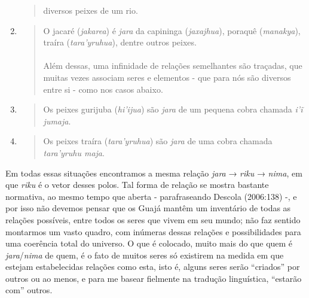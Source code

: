 \begin{enumerate}
\begin{quote}
  diversos peixes de um rio.
  \end{quote}
\item
  \begin{quote}
  O jacaré (\emph{jakarea}) é \emph{jara} da capininga
  (\emph{jaxajhua}), poraquê (\emph{manakya}), traíra
  (\emph{tara'yruhua}), dentre outros peixes.\\
  ~\\
  Além dessas, uma infinidade de relações semelhantes são traçadas, que
  muitas vezes associam seres e elementos - que para nós são diversos
  entre si - como nos casos abaixo.
  \end{quote}
\item
  \begin{quote}
  Os peixes gurijuba (\emph{hi'ijua}) são \emph{jara} de um pequena
  cobra chamada \emph{i'ĩ jumaja}.
  \end{quote}
\item
  \begin{quote}
  Os peixes traíra (\emph{tara'yruhua}) são \emph{jara} de uma cobra
  chamada \emph{tara'yruhu maja}.
  \end{quote}
\end{enumerate}

Em todas essas situações encontramos a mesma relação \emph{jara} →
\emph{riku} → \emph{nima}, em que \emph{riku} é o vetor desses polos.
Tal forma de relação se mostra bastante normativa, ao mesmo tempo que
aberta - parafraseando Descola (2006:138) -, e por isso não devemos
pensar que os Guajá mantêm um inventário de todas as relações possíveis,
entre todos os seres que vivem em seu mundo; não faz sentido montarmos
um vasto quadro, com inúmeras dessas relações e possibilidades para uma
coerência total do universo. O que é colocado, muito mais do que quem é
\emph{jara}/\emph{nima} de quem, é o fato de muitos seres só existirem
na medida em que estejam estabelecidas relações como esta, isto é,
alguns seres serão ``criados'' por outros ou ao menos, e para me basear
fielmente na tradução linguística, ``estarão com'' outros.

